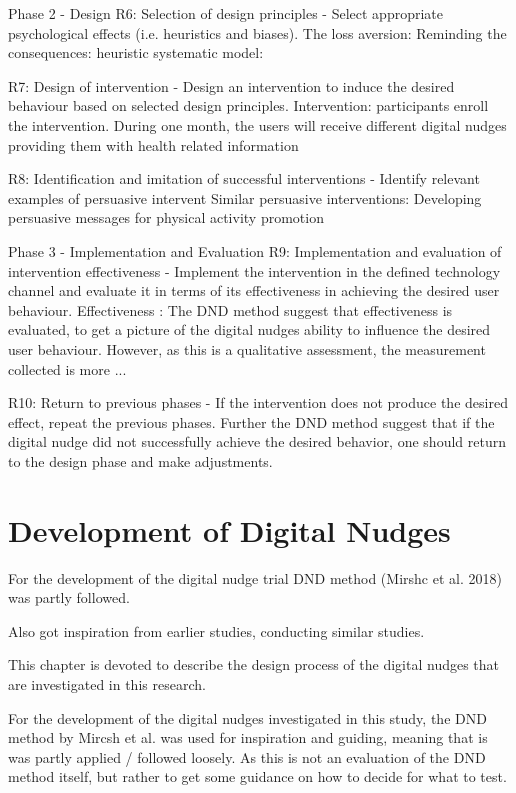 Phase 2 - Design 
R6: Selection of design principles - Select appropriate psychological effects (i.e. heuristics and biases). 
The loss aversion: 
Reminding the consequences: 
heuristic systematic model: 

R7: Design of intervention - Design an intervention to induce the desired behaviour based on selected design principles. 
Intervention: participants enroll the intervention. During one month, the users will receive different digital nudges providing them with health related information 

R8: Identification and imitation of successful interventions - Identify relevant examples of persuasive intervent
Similar persuasive interventions: 
Developing persuasive messages for physical activity promotion
 

Phase 3 - Implementation and Evaluation 
R9: Implementation and evaluation of intervention effectiveness - Implement the intervention in the defined technology channel and evaluate it in terms of its effectiveness in achieving the desired user behaviour. 
Effectiveness : The DND method suggest that effectiveness is evaluated, to get a picture of the digital nudges ability to influence the desired user behaviour. However, as this is a qualitative assessment, the measurement collected is more ...

R10: Return to previous phases - If the intervention does not produce the desired effect, repeat the previous phases. 
Further the DND method suggest that if the digital nudge did not successfully achieve the desired behavior, one should return to the design phase and make adjustments.   


\section{Development of Digital Nudges} 
For the development of the digital nudge trial DND method (Mirshc et al. 2018) was partly followed. 

Also got inspiration from earlier studies, conducting similar studies. 

This chapter is devoted to describe the design process of the digital nudges that are investigated in this research. 

For the development of the digital nudges investigated in this study, the DND method by Mircsh et al. was used for inspiration and guiding, meaning that is was partly applied / followed loosely. As this is not an evaluation of the DND method itself, but rather to get some guidance on how to decide for what to test. 

